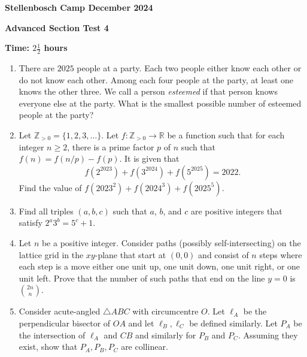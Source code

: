 \documentclass[12pt]{article}
\begin{document}
\begin{center} \large
\textbf{Stellenbosch Camp December 2024}

\textbf{Advanced Section Test 4}

\textbf{Time: \(2 \frac{1}{2}\) hours}
\end{center}

\begin{enumerate}
\item There are \(2025\) people at a party. Each two people either know each other or do not know each other. Among each four people at the party, at least one knows the other three. We call a person \emph{esteemed} if that person knows everyone else at the party. What is the smallest possible number of esteemed people at the party?
\item Let \(\mathbb{Z}_{> 0} = \{1, 2, 3, \ldots\}\). Let \(f: \mathbb{Z}_{> 0} \rightarrow \mathbb{R}\) be a function such that for each integer \(n \geqslant 2\), there is a prime factor \(p\) of \(n\) such that \(f(n) = f(n/p) - f(p)\). It is given that
\[f(2^{2023}) + f(3^{2024}) + f(5^{2025}) = 2022.\]
Find the value of \(f(2023^{2}) + f(2024^{3}) + f(2025^{5})\).
\item Find all triples \((a, b, c)\) such that \(a\), \(b\), and \(c\) are positive integers that satisfy \(2^{a}3^{b} = 5^{c} + 1\).
\item Let \(n\) be a positive integer. Consider paths (possibly self-intersecting) on the lattice grid in the \(xy\)-plane that start at \((0, 0)\) and consist of \(n\) steps where each step is a move either one unit up, one unit down, one unit right, or one unit left. Prove that the number of such paths that end on the line \(y = 0\) is \(\binom{2n}{n}\).
\item Consider acute-angled $\triangle ABC$ with circumcentre $O$. Let ${\ell}_{A}$ be the perpendicular bisector of $OA$ and let ${\ell}_B, {\ell}_C$ be defined similarly. Let $P_{A}$ be the intersection of $\ell_{A}$ and $CB$ and similarly for $P_{B}$ and $P_{C}$. Assuming they exist, show that $P_{A}, P_{B}, P_{C}$ are collinear.
\end{enumerate}
\end{document}
